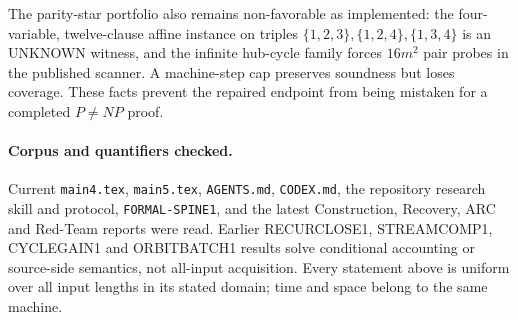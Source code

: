 \documentclass[11pt]{article}
\begin{document}
The parity-star portfolio also remains non-favorable as implemented: the
four-variable, twelve-clause affine instance on triples
$\{1,2,3\},\{1,2,4\},\{1,3,4\}$ is an UNKNOWN witness, and the infinite
hub-cycle family forces $16m^2$ pair probes in the published scanner.  A
machine-step cap preserves soundness but loses coverage.  These facts prevent
the repaired endpoint from being mistaken for a completed $P\ne NP$ proof.

\paragraph{Corpus and quantifiers checked.}
Current \texttt{main4.tex}, \texttt{main5.tex}, \texttt{AGENTS.md},
\texttt{CODEX.md}, the repository research skill and protocol,
\texttt{FORMAL-SPINE1}, and the latest Construction, Recovery, ARC and
Red-Team reports were read.  Earlier RECURCLOSE1, STREAMCOMP1, CYCLEGAIN1 and
ORBITBATCH1 results solve conditional accounting or source-side semantics,
not all-input acquisition.  Every statement above is uniform over all input
lengths in its stated domain; time and space belong to the same machine.

\end{document}

